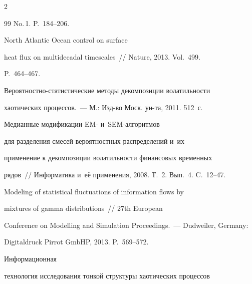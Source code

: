 \begin{multicols}{2}
{{\begin{thebibliography}{99}
No.\,1. P.~184--206.







 North Atlantic Ocean control on surface


heat flux on multidecadal timescales~// Nature, 2013. Vol.~499.


P.~464--467.









Ве\-ро\-ят\-но\-ст\-но-ста\-ти\-сти\-че\-ские методы декомпозиции волатильности


хаотических процессов.~--- М.: Изд-во Моск. ун-та, 2011. 512~с.







 Медианные  модификации EM- и~SEM-ал\-го\-рит\-мов


для разделения смесей вероятностных распределений и~их


применение к декомпозиции волатильности финансовых временных


рядов~// Информатика и~её применения, 2008. Т.~2. Вып.~4. C.~12--47.









Modeling of statistical fluctuations of information flows by


mixtures of gamma distributions~// 27th European


Conference on Modelling and Simulation Proceedings.~--- Dudweiler, Germany:


Digitaldruck Pirrot GmbHP, 2013. P.~569--572.







 Информационная


технология исследования тонкой структуры хаотических процессов 



\end{thebibliography}}}
\end{multicols}
